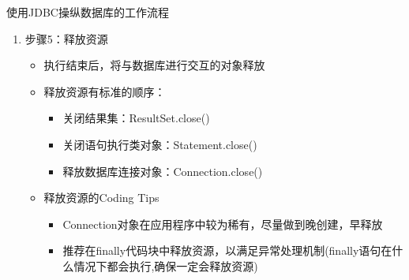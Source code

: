 \begin{frame}{使用JDBC操纵数据库的工作流程}
\begin{enumerate}
\begin{itemize}
    \end{itemize}
  \framebreak
    \item 步骤5：释放资源
    \begin{itemize}
        \item 执行结束后，将与数据库进行交互的对象释放
        \item 释放资源有标准的顺序：
        \begin{itemize}
            \item 关闭结果集：ResultSet.close()
            \item 关闭语句执行类对象：Statement.close()
            \item 释放数据库连接对象：Connection.close()
        \end{itemize}
        \item 释放资源的Coding Tips
        \begin{itemize}
            \item Connection对象在应用程序中较为稀有，尽量做到晚创建，早释放
            \item 推荐在finally代码块中释放资源，以满足异常处理机制(finally语句在什么情况下都会执行,确保一定会释放资源)
        \end{itemize}
    \end{itemize}
\end{enumerate}
\end{frame}


